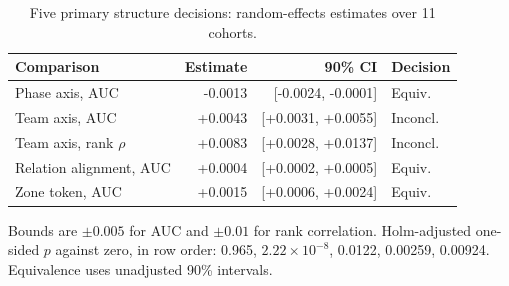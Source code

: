 \begin{table}[t]
\centering\footnotesize
\caption{Five primary structure decisions: random-effects estimates over 11 cohorts.}
\label{tab:primary}
\setlength{\tabcolsep}{2.5pt}
\begin{tabular}{lrrl}
\toprule
Comparison & Estimate & 90\% CI & Decision \\
\midrule
Phase axis, AUC & -0.0013 & [-0.0024, -0.0001] & Equiv. \\
Team axis, AUC & +0.0043 & [+0.0031, +0.0055] & Inconcl. \\
Team axis, rank $\rho$ & +0.0083 & [+0.0028, +0.0137] & Inconcl. \\
Relation alignment, AUC & +0.0004 & [+0.0002, +0.0005] & Equiv. \\
Zone token, AUC & +0.0015 & [+0.0006, +0.0024] & Equiv. \\
\bottomrule
\end{tabular}
\smallskip
\parbox{\columnwidth}{\scriptsize Bounds are $\pm0.005$ for AUC and $\pm0.01$ for rank correlation. Holm-adjusted one-sided $p$ against zero, in row order: 0.965, $2.22\times10^{-8}$, 0.0122, 0.00259, 0.00924. Equivalence uses unadjusted 90\% intervals.}
\end{table}
